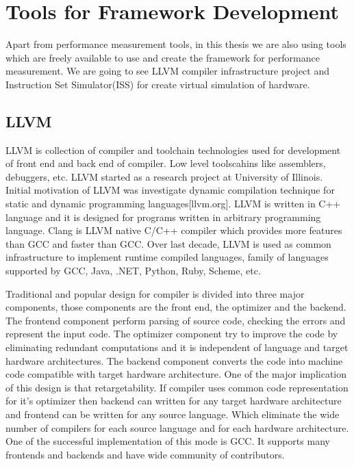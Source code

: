 \section{Tools for Framework Development}
Apart from performance measurement tools, in this thesis we are also using tools which are freely available to use and create the framework for performance measurement. We are going to see LLVM compiler infrastructure project and Instruction Set Simulator(ISS) for create virtual simulation of hardware. 

\subsection{LLVM}
LLVM is collection of compiler and toolchain technologies used for development of front end and back end of compiler. Low level toolscahins like assemblers, debuggers, etc. LLVM started as a research project at University of Illinois. Initial motivation of LLVM was investigate dynamic compilation technique for static and dynamic programming languages[llvm.org]. LLVM is written in C++ language and it is designed for programs written in arbitrary programming language. Clang is LLVM native C/C++ compiler which provides more features than GCC and faster than GCC. Over last decade, LLVM is used as common infrastructure to implement runtime compiled languages, family of languages supported by GCC, Java, .NET, Python, Ruby, Scheme, etc. 

\par Traditional and popular design for compiler is divided into three major components, those components are the front end, the optimizer and the backend. The frontend component perform parsing of source code, checking the errors and represent the input code. The optimizer component try to improve the code by eliminating redundant computations and it is independent of language and target hardware architectures. The backend component converts the code into machine code compatible with target hardware architecture. One of the major implication of this design is that retargetability. If compiler uses common code representation for it's optimizer then backend can written for any target hardware architecture and frontend can be written for any source language. Which eliminate the wide number of compilers for each source language and for each hardware architecture. One of the successful implementation of this mode is GCC. It supports many frontends and backends and have wide community of contributors. 


